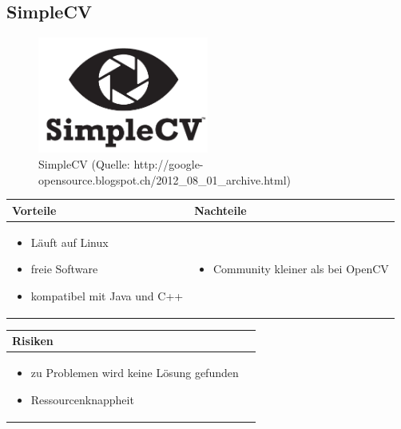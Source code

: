 \pagebreak


\subsection{SimpleCV}
\begin{figure}[h!]%
\centering
\includegraphics[width=0.5\textwidth]{fig/simplecv.png}
\caption{SimpleCV (Quelle: http://google-opensource.blogspot.ch/2012\_08\_01\_archive.html)}
\label{fig:SimpleCV}
\end{figure}

\begin{table}[h]
\begin{tabular}{p{} | p{}}


 \textbf{Vorteile} & \textbf{Nachteile} \\ \hline
	 
\begin{itemize}
\item Läuft auf Linux
\item freie Software
\item kompatibel mit Java und C++
\end{itemize}

 &
 
\begin{itemize}
\item Community kleiner als bei OpenCV
\end{itemize}

\end{tabular}
\end{table}

\begin{table}[h]
\begin{tabular}{p{}p{}}


\textbf{Risiken} & \\ \hline
	 
\begin{itemize}
\item zu Problemen wird keine Lösung gefunden
\item Ressourcenknappheit
\end{itemize}
 
\end{tabular}
\end{table}

\pagebreak